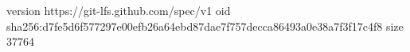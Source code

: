 version https://git-lfs.github.com/spec/v1
oid sha256:d7fe5d6f577297e00efb26a64ebd87dae7f757decca86493a0e38a7f3f17c4f8
size 37764
